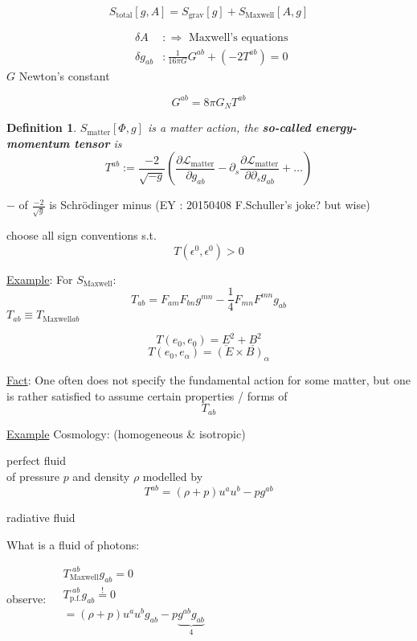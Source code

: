 \documentclass[10pt, twoside]{amsart}
\newtheorem{definition}{Definition}
\begin{document}
\begin{multicols*}{2}
\[
S_{\text{total}}[g,A] = S_{\text{grav}}[g] + S_{\text{Maxwell}}[A,g]
\]

\[
\begin{aligned}
  & \delta A     & : \Longrightarrow \text{ Maxwell's equations } \\
  & \delta g_{ab} & : \boxed{ \frac{1}{ 16 \pi G } G^{ab} } + (-2T^{ab} ) = 0 
\end{aligned}
\]
$G$ Newton's constant

\[
G^{ab} = 8 \pi G_N T^{ab}
\]

\begin{definition}
$  S_{\text{matter}}[\Phi,g] $ is a matter action, the \textbf{so-called energy-momentum tensor} is 
\[
T^{ab} := \frac{-2}{ \sqrt{-g}} \left( \frac{ \partial \mathcal{L}_{\text{matter}} }{ \partial g_{ab}} - \partial_s \frac{ \partial \mathcal{L}_{\text{matter}} }{ \partial \partial_s g_{ab}} + \dots \right)
\]
\end{definition}
$-$ of $\frac{-2}{\sqrt{g}}$ is Schr\"{o}dinger minus (EY : 20150408 F.Schuller's joke? but wise)

choose all sign conventions s.t.
\[
T(\epsilon^0,\epsilon^0) >0
\]

\underline{Example}: For $S_{\text{Maxwell}}$:
\[
T_{ab} = F_{am} F_{bn}g^{mn} - \frac{1}{4} F_{mn} F^{mn} g_{ab}
\]
$T_{ab} \equiv T_{\text{Maxwell}ab}$

\[
T(e_0,e_0) = \underline{E}^2+\underline{B}^2
\]
\[
T(e_0,e_{\alpha}) = (E\times B)_{\alpha}
\]

\underline{Fact}: One often does not specify the fundamental action for some matter, but one is rather satisfied to assume certain properties / forms of 
\[
T_{ab}
\]

\underline{Example} Cosmology: (homogeneous \& isotropic)

perfect fluid \\

of pressure $p$ and density $\rho$
modelled by
\[
T^{ab} = (\rho + p)u^a u^b - pg^{ab}
\]

radiative fluid

What is a fluid of photons:

observe: $\begin{aligned}
  & T_{\text{Maxwell}}^{ \, \, ab} g_{ab} = 0 \\ 
  & T_{\text{p.f.}}^{ \, \, ab} g_{ab} \overset{!}{=} 0 \\
& = (\rho + p)u^a u^b g_{ab} - p\underbrace{ g^{ab} g_{ab} }_{ 4}
\end{aligned}$


\end{multicols*}
\end{document}
